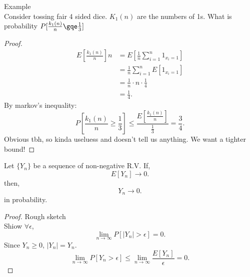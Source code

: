 \documentclass[a4paper]{article}
\begin{document}
\begin{note}{Example}\\
  Consider tossing fair 4 sided dice. $K_1(n)$ are the numbers of 1s. What is probability  $P[\frac{k_1(n)}{n} \gqe \frac{1}{3}]$ 

  \begin{proof}
    \begin{align*}
      E[\frac{k_1(n)}{n}] n&= E[\frac{1}{n} \sum_{i=1}^{n} 1_{x_i =1}] \\
                          &= \frac{1}{n} \sum_{i=1}^{n}E[1_{x_i =1}] \\
                          &= \frac{1}{n} \cdot n \cdot \frac{1}{4} \\
                          &= \frac{1}{4}
    .\end{align*}
    By markov's inequality:
    \[
      P[\frac{k_1(n)}{n} \geq \frac{1}{3}] \leq \frac{E[\frac{k_1(n)}{n}]}{\frac{1}{3}} = \frac{3}{4} 
    .\] 
    Obvious tbh, so kinda useluess and doesn't tell us anything. We want a tighter bound!
  \end{proof}
\end{note}

\begin{prop}
  Let $\{Y_n\} $ be a sequence of non-negative R.V. If,
   \[
     E[Y_n] \to 0
  .\] 
  then, 
  \[
  Y_n \to 0
  .\] 
  in probability. 
  \begin{proof}{Rough sketch}\\
    Shiow $\forall \epsilon$,
     \[
       \lim_{n \to \infty} P[|Y_n| > \epsilon] = 0
    .\] 
    Since $Y_n \geq 0$,  $|Y_n| = Y_n$.
     \[
       \lim_{n \to \infty} P[Y_n > \epsilon] \leq \lim_{n \to \infty} \frac{E[Y_n]}{\epsilon} = 0
    .\] 
  \end{proof}
\end{prop}
\end{document}

